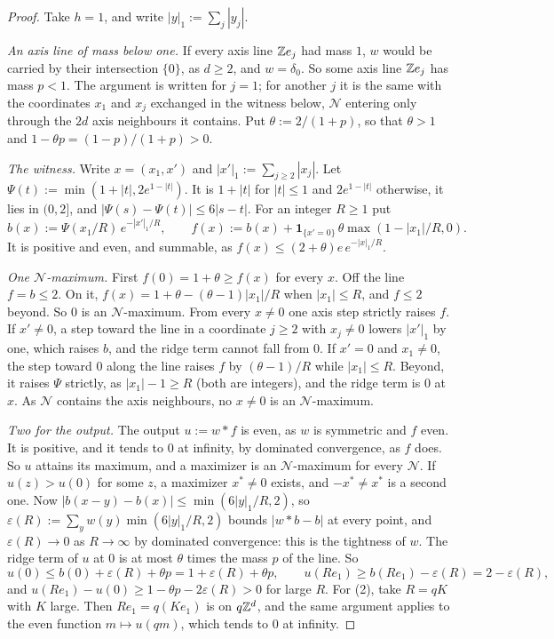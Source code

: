\begin{proof}
\leanok
{}
Take $h = 1$, and write $|y|_1 := \sum_j|y_j|$.

\emph{An axis line of mass below one.} If every axis line $\mathbb{Z} e_j$ had mass $1$, $w$ would be
carried by their intersection $\{0\}$, as $d \ge 2$, and $w = \delta_0$. So some axis line
$\mathbb{Z} e_j$ has mass $p < 1$. The argument is written for $j = 1$; for another $j$ it is the same with
the coordinates $x_1$ and $x_j$ exchanged in the witness below, $\mathcal{N}$ entering only through
the $2d$ axis neighbours it contains. Put $\theta := 2/(1 + p)$, so that $\theta > 1$ and
$1 - \theta p = (1 - p)/(1 + p) > 0$.

\emph{The witness.} Write $x = (x_1, x')$ and $|x'|_1 := \sum_{j \ge 2}|x_j|$. Let
$\Psi(t) := \min(1 + |t|, 2e^{1 - |t|})$. It is $1 + |t|$ for $|t| \le 1$ and $2e^{1 - |t|}$
otherwise, it lies in $(0, 2]$, and $|\Psi(s) - \Psi(t)| \le 6|s - t|$. For an integer $R \ge 1$ put
\[
  b(x) := \Psi(x_1/R)\,e^{-|x'|_1/R}, \qquad
  f(x) := b(x) + \mathbf{1}_{\{x' = 0\}}\,\theta\max(1 - |x_1|/R, 0) .
\]
It is positive and even, and summable, as $f(x) \le (2 + \theta)e\,e^{-|x|_1/R}$.

\emph{One $\mathcal{N}$-maximum.} First $f(0) = 1 + \theta \ge f(x)$ for every $x$. Off the line
$f = b \le 2$. On it, $f(x) = 1 + \theta - (\theta - 1)|x_1|/R$ when $|x_1| \le R$, and $f \le 2$
beyond. So $0$ is an $\mathcal{N}$-maximum. From every $x \ne 0$ one axis step strictly raises $f$.
If $x' \ne 0$, a step toward the line in a coordinate $j \ge 2$ with $x_j \ne 0$ lowers $|x'|_1$ by
one, which raises $b$, and the ridge term cannot fall from $0$. If $x' = 0$ and $x_1 \ne 0$, the step
toward $0$ along the line raises $f$ by $(\theta - 1)/R$ while $|x_1| \le R$. Beyond, it raises $\Psi$
strictly, as $|x_1| - 1 \ge R$ (both are integers), and the ridge term is $0$ at $x$. As
$\mathcal{N}$ contains the axis neighbours, no $x \ne 0$ is an $\mathcal{N}$-maximum.

\emph{Two for the output.} The output $u := w * f$ is even, as $w$ is symmetric and $f$ even. It is
positive, and it tends to $0$ at infinity, by dominated convergence, as $f$ does. So $u$ attains its
maximum, and a maximizer is an $\mathcal{N}$-maximum for every $\mathcal{N}$. If $u(z) > u(0)$ for
some $z$, a maximizer $x^* \ne 0$ exists, and $-x^* \ne x^*$ is a second one. Now
$|b(x - y) - b(x)| \le \min(6|y|_1/R, 2)$, so
$\varepsilon(R) := \sum_yw(y)\min(6|y|_1/R, 2)$ bounds $|w * b - b|$ at every point, and
$\varepsilon(R) \to 0$ as $R \to \infty$ by dominated convergence: this is the tightness of $w$. The
ridge term of $u$ at $0$ is at most $\theta$ times the mass $p$ of the line. So
\[
  u(0) \le b(0) + \varepsilon(R) + \theta p = 1 + \varepsilon(R) + \theta p, \qquad
  u(Re_1) \ge b(Re_1) - \varepsilon(R) = 2 - \varepsilon(R),
\]
and $u(Re_1) - u(0) \ge 1 - \theta p - 2\varepsilon(R) > 0$ for large $R$. For (2), take $R = qK$
with $K$ large. Then $Re_1 = q(Ke_1)$ is on $q\mathbb{Z}^d$, and the same argument applies to the even
function $m \mapsto u(qm)$, which tends to $0$ at infinity.


\end{proof}
